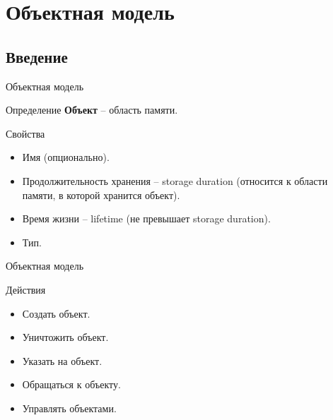 \documentclass[xetex,mathserif,serif,10pt]{beamer}
\begin{document}
    \section{Объектная модель}
    \subsection{Введение}
    \begin{frame}{Объектная модель}
        \begin{block}{Определение}
            \textbf{Объект} -- область памяти.
        \end{block}
        \begin{block}{Свойства}
            \begin{itemize}
                \item Имя (опционально).
                \item Продолжительность хранения -- storage duration (относится к области памяти, в которой хранится объект).
                \item Время жизни -- lifetime (не превышает storage duration).
                \item Тип.
            \end{itemize}
        \end{block}
    \end{frame}
    \begin{frame}{Объектная модель}
        \begin{block}{Действия}
            \begin{itemize}
                \item Создать объект.
                \item Уничтожить объект.
                \item Указать на объект.
                \item Обращаться к объекту.
                \item Управлять объектами.
            \end{itemize}
        \end{block}
    \end{frame}
\end{document}
